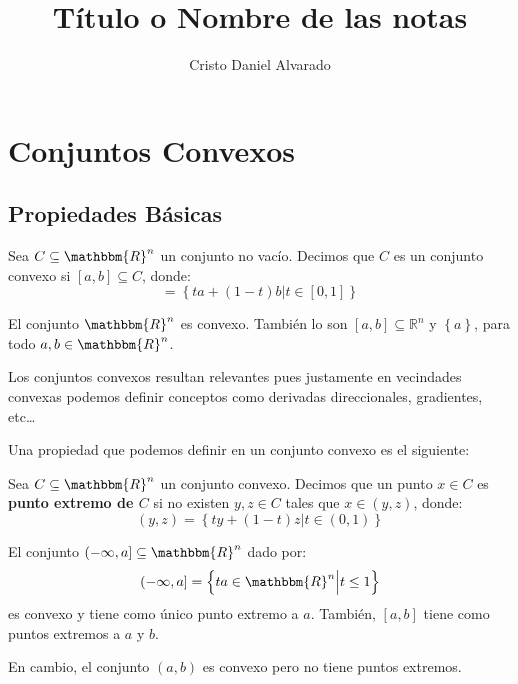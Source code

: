\documentclass[12pt]{report}
\theoremstyle{largebreak}
\newcommand{\bbm}[1]{\ensuremath{\mathbbm{#1}}}
\begin{document}
\setlength{\parskip}{5pt}
\setlength{\parindent}{12pt}
\title{T\'itulo o Nombre de las notas}
\author{Cristo Daniel Alvarado}
\maketitle

\tableofcontents

\lstlistoflistings

\newpage

\chapter{Conjuntos Convexos}

\section{Propiedades Básicas}

\begin{mydef}
    Sea $C\subseteq\bbm{R}^n$ un conjunto no vacío. Decimos que $C$ es un conjunto convexo si $[a,b]\subseteq C$, donde:
    \begin{equation*}
        [a,b]=\left\{ta+(1-t)b\Big|t\in[0,1] \right\}
    \end{equation*}
\end{mydef}

\begin{exa}
    El conjunto $\bbm{R}^n$ es convexo. También lo son $[a,b]\subseteq\mathbb{R}^n$ y $\left\{a\right\}$, para todo $a,b\in\bbm{R}^n$.
\end{exa}

Los conjuntos convexos resultan relevantes pues justamente en vecindades convexas podemos definir conceptos como derivadas direccionales, gradientes, etc\dots

Una propiedad que podemos definir en un conjunto convexo es el siguiente:

\begin{mydef}
    Sea $C\subseteq\bbm{R}^n$ un conjunto convexo. Decimos que un punto $x\in C$ es \textbf{punto extremo de $C$} si no existen $y,z\in C$ tales que $x\in(y,z)$, donde:
    \begin{equation*}
        (y,z)=\left\{ty+(1-t)z\Big|t\in(0,1) \right\}
    \end{equation*}
\end{mydef}

\begin{exa}
    El conjunto $(-\infty,a]\subseteq\bbm{R}^n$ dado por:
    \begin{equation*}
        (-\infty,a]=\left\{ta\in\bbm{R}^n\Big|t\leq1 \right\}
    \end{equation*}
    es convexo y tiene como único punto extremo a $a$. También, $[a,b]$ tiene como puntos extremos a $a$ y $b$.

    En cambio, el conjunto $(a,b)$ es convexo pero no tiene puntos extremos.
\end{exa}
\end{document}
